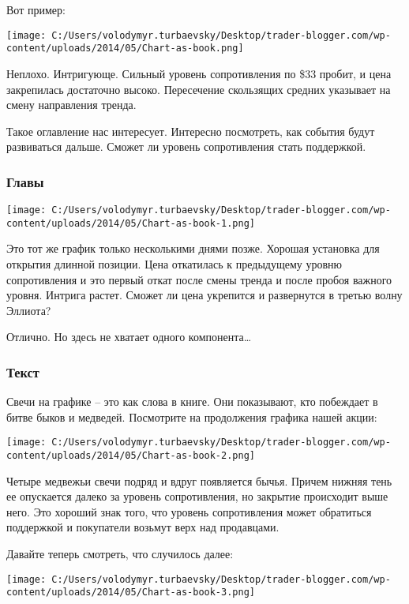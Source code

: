 \documentclass[a5paper]{article}
\begin{document}
Вот пример:

\texttt{[image: C:/Users/volodymyr.turbaevsky/Desktop/trader-blogger.com/wp-content/uploads/2014/05/Chart-as-book.png]}

Неплохо. Интригующе. Сильный уровень сопротивления по \$33 пробит, и цена закрепилась достаточно высоко. Пересечение скользящих средних указывает на смену направления тренда.

Такое оглавление нас интересует. Интересно посмотреть, как события будут развиваться дальше. Сможет ли уровень сопротивления стать поддержкой.

\subsubsection{Главы}

\texttt{[image: C:/Users/volodymyr.turbaevsky/Desktop/trader-blogger.com/wp-content/uploads/2014/05/Chart-as-book-1.png]}

Это тот же график только несколькими днями позже. Хорошая установка для открытия длинной позиции. Цена откатилась к предыдущему уровню сопротивления и это первый откат после смены тренда и после пробоя важного уровня. Интрига растет. Сможет ли цена укрепится и развернутся в третью волну Эллиота?

Отлично. Но здесь не хватает одного компонента…

\subsubsection{Текст}

Свечи на графике – это как слова в книге. Они показывают, кто
побеждает в битве быков и медведей. Посмотрите на продолжения графика
нашей акции:

\texttt{[image: C:/Users/volodymyr.turbaevsky/Desktop/trader-blogger.com/wp-content/uploads/2014/05/Chart-as-book-2.png]}

Четыре медвежьи свечи подряд и вдруг появляется бычья. Причем нижняя тень ее опускается далеко за уровень сопротивления, но закрытие происходит выше него. Это хороший знак того, что уровень сопротивления может обратиться поддержкой и покупатели возьмут верх над продавцами.

Давайте теперь смотреть, что случилось далее:

\texttt{[image: C:/Users/volodymyr.turbaevsky/Desktop/trader-blogger.com/wp-content/uploads/2014/05/Chart-as-book-3.png]}
\end{document}
